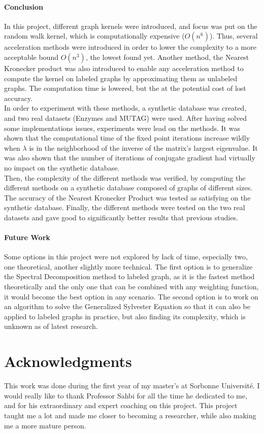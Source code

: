 \documentclass{article}
\theoremstyle{definition}
\begin{document}
\paragraph{Conclusion}
In this project, different graph kernels were introduced, and focus was put on the random walk kernel, which is computationally expensive ($O(n^6)$). Thus, several acceleration methods were introduced in order to lower the complexity to a more acceptable bound $O(n^3)$, the lowest found yet. Another method, the Nearest Kronecker product was also introduced to enable any acceleration method to compute the kernel on labeled graphs by approximating them as unlabeled graphs. The computation time is lowered, but the at the potential cost of lost accuracy.\\
In order to experiment with these methods, a synthetic database was created, and two real datasets (Enzymes and MUTAG) were used. After having solved some implementations issues, experiments were lead on the methods. It was shown that the computational time of the fixed point iterations increase wildly when $\lambda$ is in the neighborhood of the inverse of the matrix's largest eigenvalue. It was also shown that the number of iterations of conjugate gradient had virtually no impact on the synthetic database.\\
Then, the complexity of the different methods was verified, by computing the different methods on a synthetic database composed of graphs of different sizes. The accuracy of the Nearest Kronecker Product was tested as satisfying on the synthetic database. Finally, the different methods were tested on the two real datasets and gave good to significantly better results that previous studies.
\paragraph{Future Work}
Some options in this project were not explored by lack of time, especially two, one theoretical, another slightly more technical. The first option is to generalize the Spectral Decomposition method to labeled graph, as it is the fastest method theoretically and the only one that can be combined with any weighting function, it would become the best option in any scenario. The second option is to work on an algorithm to solve the Generalized Sylvester Equation so that it can also be applied to labeled graphs in practice, but also finding its complexity, which is unknown as of latest research.

\section*{Acknowledgments}
This work was done during the first year of my master's at Sorbonne Université. I would really like to thank Professor Sahbi for all the time he dedicated to me, and for his extraordinary and expert coaching on this project. This project taught me a lot and made me closer to becoming a researcher, while also making me a more mature person.
\end{document}
